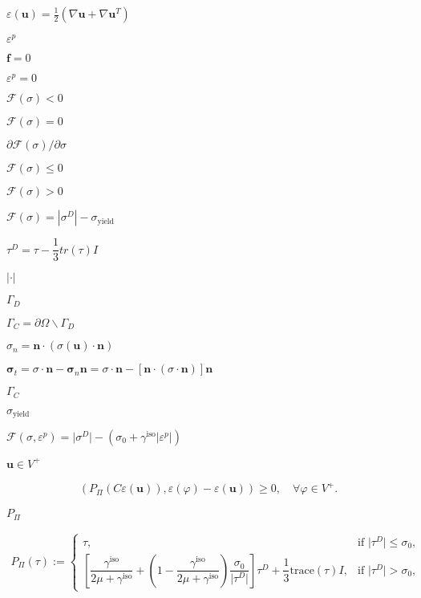 \documentclass{article}
\begin{document}
$\varepsilon(\mathbf u)=\frac{1}{2}\left(\nabla \mathbf u + \nabla \mathbf u^T\right)$
\pagebreak

$\varepsilon^p$
\pagebreak

$\mathbf f=0$
\pagebreak

$\varepsilon^p=0$
\pagebreak

$\mathcal{F}(\sigma)< 0$
\pagebreak

$\mathcal{F}(\sigma) = 0$
\pagebreak

$\partial \mathcal{F}(\sigma)/\partial \sigma$
\pagebreak

$\mathcal{F}(\sigma)\le 0$
\pagebreak

$\mathcal{F}(\sigma)> 0$
\pagebreak

$\mathcal{F}(\sigma)=|\sigma^D|-\sigma_{\text{yield}}$
\pagebreak

$\tau^D = \tau - \dfrac{1}{3}tr(\tau)I$
\pagebreak

$|\cdot|$
\pagebreak

$\Gamma_D$
\pagebreak

$\Gamma_C=\partial\Omega\backslash\Gamma_D$
\pagebreak

$\sigma_n=\mathbf n \cdot (\sigma(\mathbf u) \cdot \mathbf n)$
\pagebreak

$\mathbf \sigma_t= \sigma \cdot \mathbf n - \mathbf \sigma_n \mathbf n = \sigma \cdot \mathbf n - [\mathbf n \cdot(\sigma \cdot \mathbf n)]\mathbf n$
\pagebreak

$\Gamma_C$
\pagebreak

$\sigma_{\text{yield}}$
\pagebreak

$\mathcal{F}(\sigma,\varepsilon^p) = \vert\sigma^D\vert - (\sigma_0 + \gamma^{\text{iso}}|\varepsilon^p|)$
\pagebreak

$\mathbf u \in V^+$
\pagebreak

\begin{align*} \left(P_{\Pi}(C\varepsilon(\mathbf u)),\varepsilon(\varphi) - \varepsilon(\mathbf u)\right) \geq 0,\quad \forall \varphi\in V^+. \end{align*}
\pagebreak

$P_\Pi$
\pagebreak

\begin{align*} P_{\Pi}(\tau):=\begin{cases} \tau, & \text{if }\vert\tau^D\vert \leq \sigma_0,\\ \left[ \dfrac{\gamma^{\text{iso}}}{2\mu + \gamma^{\text{iso}}} + \left(1-\dfrac{\gamma^{\text{iso}}}{2\mu + \gamma^{\text{iso}}}\right)\dfrac{\sigma_0}{\vert\tau^D\vert} \right]\tau^D + \dfrac{1}{3}\text{trace}(\tau) I, & \text{if }\vert\tau^D\vert > \sigma_0, \end{cases} \end{align*}
\pagebreak
\end{document}
